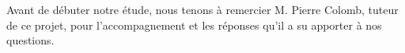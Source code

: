 
Avant de débuter notre étude, nous tenons à remercier M. Pierre Colomb, tuteur de ce projet, pour l'accompagnement et les réponses qu'il a su apporter à nos questions.